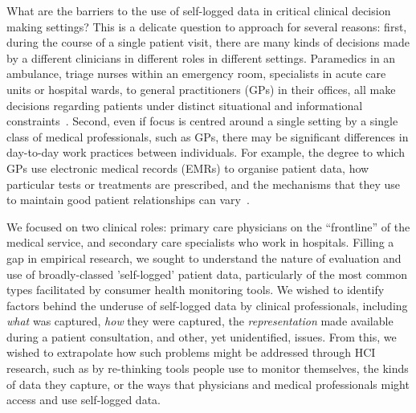 \documentclass{sigchi}
\begin{document}

What are the barriers to the use of self-logged data in critical clinical decision making settings?  This is a delicate question to approach for several reasons: first, during the course of a single patient visit, there are many kinds of decisions made by a different clinicians in different roles in different settings.   Paramedics in an ambulance, triage nurses within an emergency room, specialists in acute care units or hospital wards, to general practitioners (GPs) in their offices, all make decisions regarding patients under distinct situational and informational constraints~\cite{Croskerry2013}. Second, even if focus is centred around a single setting by a single class of medical professionals, such as GPs, there may be significant differences in day-to-day work practices between individuals. For example, the degree to which GPs use electronic medical records (EMRs) to organise patient data, how particular tests or treatments are prescribed, and the mechanisms that they use to maintain good patient relationships can vary~\cite{smellie_is_2002}. 

We focused on two clinical roles: primary care physicians on the ``frontline'' of the medical service, and secondary care specialists who work in hospitals.  Filling a gap in empirical research, we sought to understand the nature of evaluation and use of broadly-classed 'self-logged' patient data, particularly of the most common types facilitated by consumer health monitoring tools.  We wished to identify factors behind the underuse of self-logged data by clinical professionals, including \emph{what} was captured, \emph{how} they were  captured,  the \emph{representation} made available during a patient consultation, and other, yet unidentified, issues.  From this, we wished to extrapolate how such problems might be addressed through HCI research, such as by re-thinking tools people use to monitor themselves, the kinds of data they capture, or the ways that physicians and medical professionals might access and use self-logged data.

\end{document}
